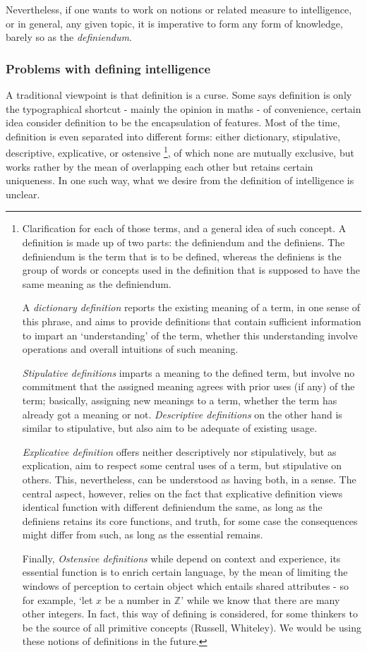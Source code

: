 Nevertheless, if one wants to work on notions or related measure to intelligence, or in general, any given topic, it is imperative to form any form of knowledge, barely so as the \textit{definiendum}. 
\subsubsection{Problems with defining intelligence}
A traditional viewpoint is that definition is a curse. Some says definition is only the typographical shortcut - mainly the opinion in maths - of convenience, certain idea consider definition to be the encapsulation of features. Most of the time, definition is even separated into different forms: either dictionary, stipulative, descriptive, explicative, or ostensive \footnote{Clarification for each of those terms, and a general idea of such concept. A definition is made up of two parts: the definiendum and the definiens. The definiendum is the term that is to be defined, whereas the definiens is the group of words or concepts used in the definition that is supposed to have the same meaning as the definiendum. 

A \textit{dictionary definition} reports the existing meaning of a term, in one sense of this phrase, and aims to provide definitions that contain sufficient information to impart an `understanding' of the term, whether this understanding involve operations and overall intuitions of such meaning. 

\textit{Stipulative definitions} imparts a meaning to the defined term, but involve no commitment that the assigned meaning agrees with prior uses (if any) of the term; basically, assigning new meanings to a term, whether the term has already got a meaning or not. \textit{Descriptive definitions} on the other hand is similar to stipulative, but also aim to be adequate of existing usage. 

\textit{Explicative definition} offers neither descriptively nor stipulatively, but as explication, aim to respect some central uses of a term, but stipulative on others. This, nevertheless, can be understood as having both, in a sense. The central aspect, however, relies on the fact that explicative definition views identical function with different definiendum the same, as long as the definiens retains its core functions, and truth, for some case the consequences might differ from such, as long as the essential remains. 

Finally, \textit{Ostensive definitions} while depend on context and experience, its essential function is to enrich certain language, by the mean of limiting the windows of perception to certain object which entails shared attributes - so for example, `let $x$ be a number in $\mathbb{Z}$' while we know that there are many other integers. In fact, this way of defining is considered, for some thinkers to be the source of all primitive concepts (Russell, Whiteley). We would be using these notions of definitions in the future.}, of which none are mutually exclusive, but works rather by the mean of overlapping each other but retains certain uniqueness. In one such way, what we desire from the definition of intelligence is unclear. 

